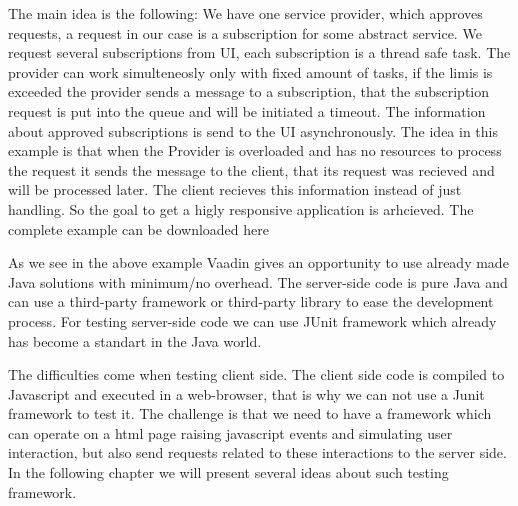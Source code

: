 	   The main idea is the following:
		 We have one service provider, which approves requests, a request in our case
		 is a subscription for some abstract service.
		 We request several subscriptions from UI, each subscription is a thread safe task. The provider can work simulteneosly
		 only with fixed amount of tasks, if the limis is exceeded the provider sends a message to a subscription,
		 that the subscription request is put into the queue and will be initiated a
		 timeout. The information about approved subscriptions is send to the UI
		 asynchronously. The idea in this example is that when the Provider is
		 overloaded and has no resources to process the request it sends the message
		 to the client, that its request was recieved and will be processed later. The
		 client recieves this information instead of just handling. So the goal to get
		 a higly responsive application is arhcieved. The complete example can be
		 downloaded here \cite{vaadinAkka}
	
	  As we see in the above example Vaadin gives an opportunity to use already
	  made Java solutions with minimum/no overhead. The server-side code is pure
	  Java and can use a third-party framework or third-party library to ease the
	  development process. For testing server-side code we can use JUnit framework
	  which already has become a standart in the Java world.
	  
	  The difficulties come when testing client side. The client side code is
	  compiled to Javascript and executed in a web-browser, that is why we can not
	  use a Junit framework to test it. The challenge is that we need to have a
	  framework which can operate on a html page raising javascript events and
	  simulating user interaction, but also send requests related to these
	  interactions to the server side. In the following chapter we will
	  present several ideas about such testing framework.	   